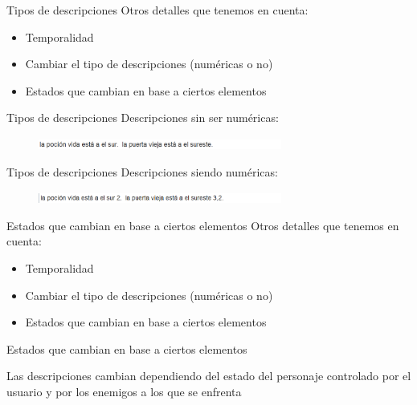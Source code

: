 
\begin{tframe}{Tipos de descripciones}
	Otros detalles que tenemos en cuenta:
	\begin{itemize}
		\item Temporalidad
		\item<+-| alert@+> Cambiar el tipo de descripciones (numéricas o no)
		\item Estados que cambian en base a ciertos elementos
	\end{itemize}
\end{tframe}

\begin{tframe}{Tipos de descripciones}
	Descripciones sin ser numéricas:
		\begin{figure}[h]
			\includegraphics[width=8cm]{../img/descripcionnonumerica.PNG}
		\end{figure}
\end{tframe}

\begin{tframe}{Tipos de descripciones}
	Descripciones siendo numéricas:
		\begin{figure}[h]
			\includegraphics[width=8cm]{../img/descripcionnumerica.PNG}
		\end{figure}
\end{tframe}


\begin{tframe}{Estados que cambian en base a ciertos elementos}
	Otros detalles que tenemos en cuenta:
	\begin{itemize}
		\item Temporalidad
		\item Cambiar el tipo de descripciones (numéricas o no)
		\item<+-| alert@+> Estados que cambian en base a ciertos elementos
	\end{itemize}
\end{tframe}

\begin{frame}[c]{Estados que cambian en base a ciertos elementos}
	\begin{center}
		Las descripciones cambian dependiendo del estado del personaje controlado por el usuario y por los enemigos a los que se enfrenta
	\end{center}
\end{frame}

